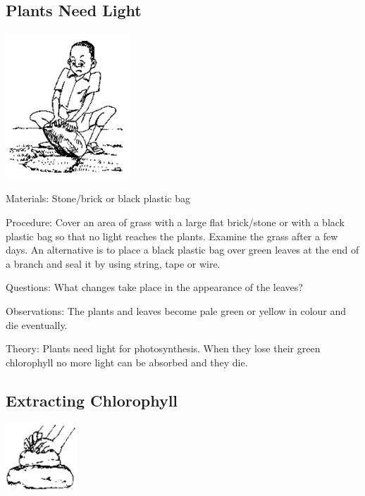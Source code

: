 \begin{multicols}{2}
\subsection{Plants Need Light} %

\begin{center}
\includegraphics[width=0.35\textwidth]{./img/source/plants-light.png}
\end{center}

\begin{description*}
\item[Materials:]{Stone/brick or black plastic bag}
\item[Procedure:]{Cover an area of grass with a large flat brick/stone or with a black plastic bag so that no
light reaches the plants. Examine the grass after a few days. An alternative is to place a black
plastic bag over green leaves at the end of a branch and seal it by using string, tape or wire.}
\item[Questions:]{What changes take place in the appearance of the leaves?}
\item[Observations:]{The plants and leaves become pale green or yellow in colour and die eventually.}
\item[Theory:]{Plants need light for photosynthesis. When they lose their green chlorophyll no more light
can be absorbed and they die.}
\end{description*}

\subsection{Extracting Chlorophyll} %

\begin{center}
\includegraphics[width=0.2\textwidth]{./img/source/chlorophyll-extract.png}
\end{center}


\end{multicols}
